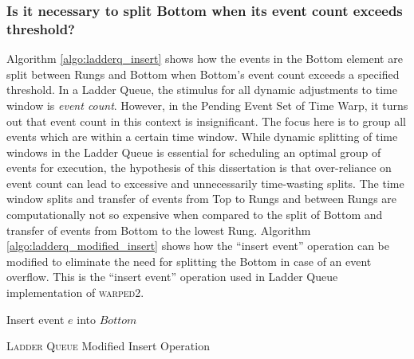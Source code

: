 \documentclass[11pt]{book}
\begin{document}
\subsubsection{Is it necessary to split Bottom when its event count exceeds threshold?}\label{subsubsec:why_no_bottom_split}

Algorithm \ref{algo:ladderq_insert} shows how the events in the Bottom element are split between Rungs and
Bottom when Bottom's event count exceeds a specified threshold.  In a Ladder Queue, the stimulus for all
dynamic adjustments to time window is \emph{event count}.  However, in the Pending Event Set of Time Warp, it
turns out that event count in this context is insignificant.  The focus here is to group all events which are
within a certain time window.  While dynamic splitting of time windows in the Ladder Queue is essential for
scheduling an optimal group of events for execution, the hypothesis of this dissertation is that over-reliance
on event count can lead to excessive and unnecessarily time-wasting splits.  The time window splits and
transfer of events from Top to Rungs and between Rungs are computationally not so expensive when compared to
the split of Bottom and transfer of events from Bottom to the lowest Rung.  Algorithm
\ref{algo:ladderq_modified_insert} shows how the ``insert event'' operation can be modified to eliminate the
need for splitting the Bottom in case of an event overflow.  This is the ``insert event'' operation used in
Ladder Queue implementation of \textsc{warped2}.

\begin{algorithm}
\DontPrintSemicolon
{}

    \;
    \;
    \;
    Insert event $e$ into $Bottom$\;
    \Return\;
    \;
\caption{\textsc{Ladder Queue} Modified Insert Operation}\label{algo:ladderq_modified_insert}
\end{algorithm}
\end{document}
